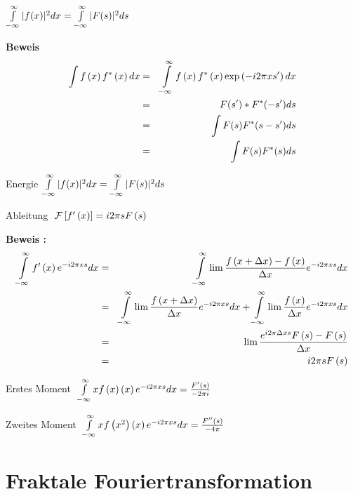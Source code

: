 \documentclass[11pt,twoside]{report}
\begin{document}
\begin{satz}[ Parseval ]
$ \int\limits_{-\infty}^{\infty} |f(x)|^{2} dx = \int\limits_{-\infty}^{\infty} |F(s)|^{2}ds $
\end{satz}
{\bf Beweis}
\begin{eqnarray*}
  \int f\left( x\right) f^{*}\left( x \right) dx 
  & = & \int\limits_{-\infty}^{\infty} f\left( x \right) f^{*}\left( x \right) \exp\left( -i2\pi xs'\right) dx \\
  & = & F(s')*F^{*}(-s')ds \\
  & = & \int F(s)F^{*}(s-s')ds \\
  & = & \int F(s)F^{*}(s)ds
\end{eqnarray*}   

\begin{satz}
Energie 
$ \int\limits_{-\infty}^{\infty} |f(x)|^{2} dx = \int\limits_{-\infty}^{\infty} |F(s)|^{2}ds $
\end{satz}
   
\begin{satz}
Ableitung
$\; {\cal F}\left[ f'\left( x \right) \right] = i2\pi s F\left( s \right) $
\end{satz}
{\bf Beweis :}
\begin{eqnarray*}
  \int\limits_{-\infty}^{\infty} f'\left( x \right)e^{ -i2\pi xs } dx 
  & = & \int\limits_{-\infty}^{\infty} \lim \frac{f\left( x+\Delta x\right) - f\left( x \right)}{\Delta x}e^{ -i2\pi xs } dx \\
  & = & \int\limits_{-\infty}^{\infty} \lim \frac{f\left( x+\Delta x\right)}{\Delta x}e^{ -i2\pi xs } dx + \int\limits_{-\infty}^{\infty} \lim  
  \frac{f\left( x \right)}{\Delta x}e^{ -i2\pi xs } dx \\
  & = & \lim \frac{e^{i2 \pi \Delta xs}F\left( s \right) - F\left( s \right)}{\Delta x} \\
  & = & i2\pi s F\left( s \right)   
\end{eqnarray*}   

\begin{satz}
Erstes Moment $\; \int\limits_{-\infty}^{\infty} x f \left( x \right) \left( x \right) e^{ -i2\pi xs } dx = \frac{F'\left( s \right)}{-2\pi i} $
\end{satz}

\begin{satz}
Zweites Moment $\; \int\limits_{-\infty}^{\infty} x f \left( x^2 \right) \left( x \right) e^{ -i2\pi xs } dx = \frac{F''\left( s \right)}{-4\pi} $
\end{satz}
   

\chapter{Fraktale Fouriertransformation}
\end{document}
